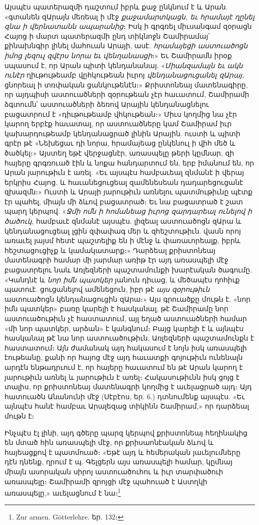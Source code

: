 \documentclass{article}
\begin{document}
{Այսպէս պատերազմի դաշտում իբրև քաջ ընկնում է և Արան. «գտանեն զԱրայն մեռեալ ի մէջ \emph{քաջամարտկացն, եւ հրամայէ ղընել զնա ի վերնատանն ապարանից}։ Իսկ ի գրգռել միւսանգամ զօրացն Հայոց ի մարտ պատերազմի ընդ տիկնոջն Շամիրամայ՝ քինախնգիր լինել մահուան Արայի, ասէ. \emph{հրամայեցի աստուածոցն իմոց լեզուլ զվէրս նորա եւ վենղանասցի}։» Եւ Շամիրամն իրօք սպասում է, որ Արան պիտի կենդանանայ. «\emph{Միանզամայն եւ ակն ունէր} ղիւթութեամբ վըհկութեան իւրոյ \emph{վենդանացուցանել զԱրայ}, ցնորեալ ի տռփական ցանկութենէն։» Քրիստոնեայ մատենագիրը, որ այդպիսի աստուածների զօրութեան չէր հաւատում, Շամիրամի ձգտումն՝ աստուածների ձեռով Արային կենդանացնելու բացատրում է «դիւթութեամբ վհկութեան։» Միւս կողմից նա չէր կարող երբէք հաւատալ, որ աստուածները կամ Շամիրամ իւր կախարդութեամբ կենդանացրած լինին Արային. ուստի և պիտի գրէր թէ «Նեխեցաւ դի նորա, հրամայեաց ընկենուլ ի վիհ մեծ և ծածկել։» Այստեղ եթէ վերջացնէր, առասպելը թերի կըմնար, զի հայերը գրգռուած էին և նոքա հանդարտում են, երբ իմանում են, որ Արան յարութիւն է առել. «Եւ այսպէս համբաւեալ զնմանէ ի վերայ երկրիս Հայոց. և հաւանեցուցեալ զամենեսեան դադարեցուցանէ զխազմն։» Ուստի և Արայի յարութիւն առնելու պատմութիւնը պէտք էր պահել, միայն մի ձևով բացատրած։ Եւ նա բացատրած է շատ պարղ կերպով. «\emph{Ջմի ոմն ի հոմանեաց իւրոց զարդարեալ ունելով ի ծածուկ}, համբաւէ զնմանէ այսպէս. լիզեալ աստուածոցն զԱրա և կենդանացուցեալ լցին զփափագ մեր և զհեշտութիւն. վասն որոյ առաւել յայսմ հետէ պաշտելիք են ի մէնջ և փառաւորեալք, իբրև հեշտացուցիչք և կամակատարք։» Դարձեալ քրիստոնեայ մատենագրի համար մի յարմար առիթ էր այդ առասպելի մէջ բացատրելու նաև Առլեզների պաշտամունքի խարէական ծագումը. «Կանդնէ և \emph{նոր իմն պատկեր} յանուն դիւաց, և մեծապէս ղոհիւք պատուէ. ցուցանելով ամենեցուն, իբր թէ \emph{այս զօրութիւն} աստուածոցն կենդանացուցին զԱրա։» Այս գրուածքը մութն է. «նոր իմն պատկեր» բառը կարելի է հասկանալ, թէ Շամիրամը նոր աստուածութիւն չէ հաստատում, այլ եղած աստուածների համար «մի նոր պատկեր, արձան» է կանգնում։ Բայց կարելի է և այնպէս հասկանալ թէ նա նոր աստուածութիւն, Առլեզների պաշտամունքն է հաստատում։ Այն ժամանակ այդ հակասում է նոյն իսկ առասպելի էութեանը, քանի որ հայոց մէջ այդ հաւատքի գոյութիւն ունենալն արդէն ենթադրւում է, որ հայերը հաւատում են թէ Արան կարող է յարութիւն առնել և յարութիւն է առել։ Հակասութիւնն իսկ ցոյց է տալիս, որ քրիստոնեայ մատենագրի կողմից է աւելացրած այդ։ Այդ հատուածն Անանունի մէջ (Սէբէոս, եր. 6.) դտնումենք այսպէս. «Եւ այնպէս հանէ համբաւ Արալեզաց տիկինն Շամիրամ,» որ դարձեալ մութն է։

Ինչպէս էլ լինի, այդ գծերը պարզ կերպով քրիստոնեայ հեղինակից են մտած հին առասպելի մէջ, որ քրիսաոնէական ձևով և հայեացքով է պատմուած։ «Եթէ այդ և հեմերական յաւելումները դէն դնենք, ղրում է պ. Գելցերն այս առասպելի համար, կըմնայ միայն ասորական սիրոյ աստուածուհու և իւր տարփածուի առասպելը։ Շամիրամի զրոյցի մէջ պահուած է Աստղկի առասպելը,» աւելացնում է նա։\footnote{Zur armen. Götterlehre. եր. 132։}

}
\end{document}
